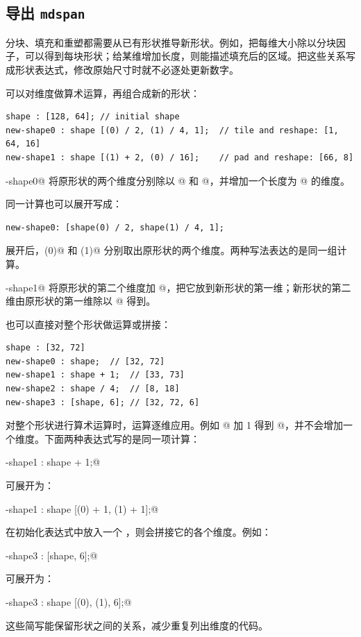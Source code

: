 \subsection*{导出 \texttt{mdspan}}

分块、填充和重塑都需要从已有形状推导新形状。例如，把每维大小除以分块因子，可以得到每块形状；给某维增加长度，则能描述填充后的区域。把这些关系写成形状表达式，修改原始尺寸时就不必逐处更新数字。

可以对维度做算术运算，再组合成新的形状：

\begin{lstlisting}[language=croqtile,caption={原始形状}]
shape : [128, 64]; // initial shape
new-shape0 : shape [(0) / 2, (1) / 4, 1];  // tile and reshape: [1, 64, 16]
new-shape1 : shape [(1) + 2, (0) / 16];    // pad and reshape: [66, 8]
\end{lstlisting}

\co@new-shape0@ 将原形状的两个维度分别除以 @ 和 @，并增加一个长度为 @ 的维度。

同一计算也可以展开写成：

\begin{lstlisting}[language=croqtile,caption={导出的形状}]
new-shape0: [shape(0) / 2, shape(1) / 4, 1];
\end{lstlisting}

展开后，\co@shape(0)@ 和 \co@shape(1)@ 分别取出原形状的两个维度。两种写法表达的是同一组计算。

\co@new-shape1@ 将原形状的第二个维度加 @，把它放到新形状的第一维；新形状的第二维由原形状的第一维除以 @ 得到。

也可以直接对整个形状做运算或拼接：

\begin{lstlisting}[language=croqtile,caption={重新绑定形状}]
shape : [32, 72]
new-shape0 : shape;  // [32, 72]
new-shape1 : shape + 1;  // [33, 73]
new-shape2 : shape / 4;  // [8, 18]
new-shape3 : [shape, 6]; // [32, 72, 6]
\end{lstlisting}

对整个形状进行算术运算时，运算逐维应用。例如 \co@[128, 64]@ 加 1 得到 \co@[129, 65]@，并不会增加一个维度。下面两种表达式写的是同一项计算：

\co@new-shape1 : shape + 1;@

可展开为：

\co@new-shape1 : shape [(0) + 1, (1) + 1];@

在初始化表达式中放入一个 \co@mdspan@，则会拼接它的各个维度。例如：

\co@new-shape3 : [shape, 6];@

可展开为：

\co@new-shape3 : shape [(0), (1), 6];@

这些简写能保留形状之间的关系，减少重复列出维度的代码。

